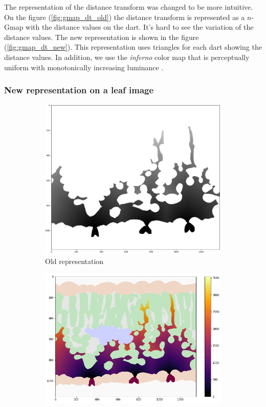 The representation of the distance transform was changed to be more intuitive. On
the figure (\ref{fig:gmap_dt_old}) the distance transform is represented as a
$n$-Gmap with the distance values on the dart. It's hard to see the variation of the
distance values. The new representation is shown in the figure (\ref{fig:gmap_dt_new}).
This representation uses triangles for each dart showing the distance values. In
addition, we use the \textit{inferno} color map that is perceptually uniform with 
monotonically increasing luminance \cite{Moreland}.

\subsubsection{New representation on a leaf image}

\begin{figure}[ht]
    \centering
    \begin{subfigure}{0.45\textwidth}
        \centering
        \includegraphics[width=\textwidth]{figures/leaf_dt_old.png}
        \caption{Old representation}
        \label{fig:leaf_dt_old}
    \end{subfigure}
    \hfill
    \begin{subfigure}{0.54\textwidth}
        \centering
        \includegraphics[width=\textwidth]{figures/leaf_dt_new.png}

\end{subfigure}
\end{figure}
